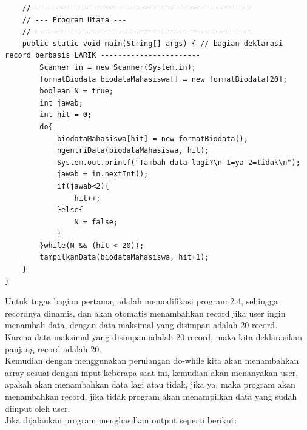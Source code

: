 \documentclass[a4paper,12pt]{article}
\begin{document}
\begin{lstlisting}
    // --------------------------------------------------
    // --- Program Utama ---
    // --------------------------------------------------
    public static void main(String[] args) { // bagian deklarasi record berbasis LARIK -----------------------
        Scanner in = new Scanner(System.in);
        formatBiodata biodataMahasiswa[] = new formatBiodata[20];
        boolean N = true;
        int jawab;
        int hit = 0;
        do{
            biodataMahasiswa[hit] = new formatBiodata();
            ngentriData(biodataMahasiswa, hit);
            System.out.printf("Tambah data lagi?\n 1=ya 2=tidak\n");
            jawab = in.nextInt();
            if(jawab<2){
                hit++;
            }else{
                N = false;
            }
        }while(N && (hit < 20));
        tampilkanData(biodataMahasiswa, hit+1);
    }
}
\end{lstlisting}
Untuk tugas bagian pertama, adalah memodifikasi program 2.4, sehingga recordnya dinamis, dan akan otomatis menambahkan
record jika user ingin menambah data, dengan data maksimal yang disimpan adalah 20 record.\\
Karena data maksimal yang disimpan adalah 20 record, maka kita deklarasikan panjang record adalah 20.\\
Kemudian dengan menggunakan perulangan do-while kita akan menambahkan array sesuai dengan input keberapa saat ini,
kemudian akan menanyakan user, apakah akan menambahkan data lagi atau tidak, jika ya, maka program akan menambahkan
record, jika tidak program akan menampilkan data yang sudah diinput oleh user.\\
Jika dijalankan program menghasilkan output seperti berikut:
\end{document}
